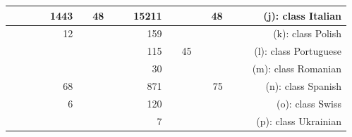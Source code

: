 \documentclass[letterpaper,10pt]{article}
\begin{document}
\begin{table}[H]
\begin{minipage}{\textwidth}
\begin{tabu}{rrrrrrrrrrrrrrrrr}
 &  &  &  & 1443 &  & 48 &  &  & 15211 &  &  &  & 48 &  &  & (j): class Italian \\ \hline
 &  &  &  & 12 &  &  &  &  & 159 &  &  &  &  &  &  & (k): class Polish \\ \hline
 &  &  &  &  &  &  &  &  & 115 &  & 45 &  &  &  &  & (l): class Portuguese \\ \hline
 &  &  &  &  &  &  &  &  & 30 &  &  &  &  &  &  & (m): class Romanian \\ \hline
 &  &  &  & 68 &  &  &  &  & 871 &  &  &  & 75 &  &  & (n): class Spanish \\ \hline
 &  &  &  & 6 &  &  &  &  & 120 &  &  &  &  &  &  & (o): class Swiss \\ \hline
 &  &  &  &  &  &  &  &  & 7 &  &  &  &  &  &  & (p): class Ukrainian \\ \hline
\end{tabu}
 \label{tab:tii_cm} 
\end{minipage} 
\end{table}
\newpage
\end{document}
